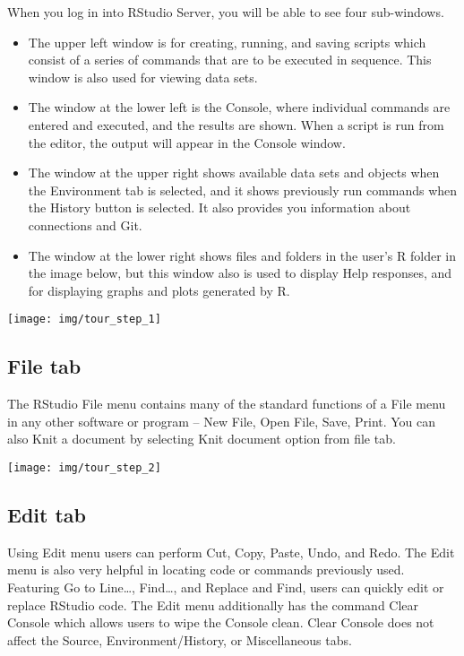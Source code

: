 \documentclass[
]{book}
\begin{document}
When you log in into RStudio Server, you will be able to see four sub-windows.

\begin{itemize}
\item
  The upper left window is for creating, running, and saving scripts which consist of a series of commands that are to be executed in sequence. This window is also used for viewing data sets.
\item
  The window at the lower left is the Console, where individual commands are entered and executed, and the results are shown. When a script is run from the editor, the output will appear in the Console window.
\item
  The window at the upper right shows available data sets and objects when the Environment tab is selected, and it shows previously run commands when the History button is selected. It also provides you information about connections and Git.
\item
  The window at the lower right shows files and folders in the user's R folder in the image below, but this window also is used to display Help responses, and for displaying graphs and plots generated by R.
\end{itemize}

\begin{center}\texttt{[image: img/tour\_step\_1]} \end{center}

\hypertarget{file-tab}{%
\subsection{File tab}\label{file-tab}}

The RStudio File menu contains many of the standard functions of a File menu in any other software or program -- New File, Open File, Save, Print. You can also Knit a document by selecting Knit document option from file tab.

\begin{center}\texttt{[image: img/tour\_step\_2]} \end{center}

\hypertarget{edit-tab}{%
\subsection{Edit tab}\label{edit-tab}}

Using Edit menu users can perform Cut, Copy, Paste, Undo, and Redo. The Edit menu is also very helpful in locating code or commands previously used. Featuring Go to Line\ldots, Find\ldots, and Replace and Find, users can quickly edit or replace RStudio code. The Edit menu additionally has the command Clear Console which allows users to wipe the Console clean. Clear Console does not affect the Source, Environment/History, or Miscellaneous tabs.
\end{document}
